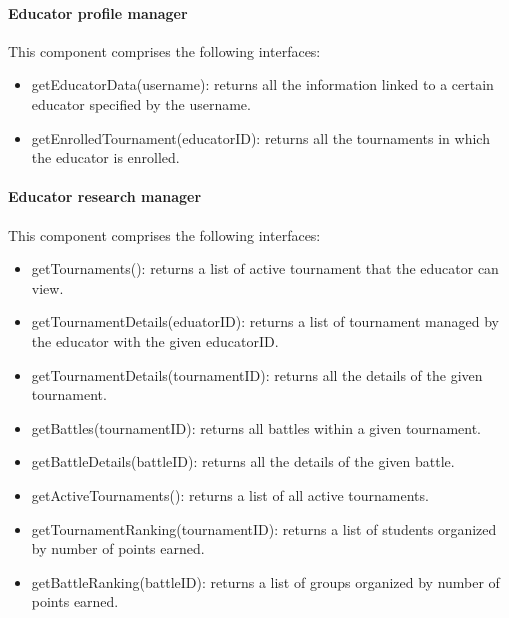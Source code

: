 \documentclass[12pt, a4paper]{report}
\begin{document}
    \paragraph*{Educator profile manager}
    This component comprises the following interfaces: 
    \begin{itemize}
        \item getEducatorData(username): returns all the information linked to a certain educator specified by the username. 
        \item getEnrolledTournament(educatorID): returns all the tournaments in which the educator is enrolled. 
    \end{itemize}

    \paragraph*{Educator research manager}
    This component comprises the following interfaces: 
    \begin{itemize}
        \item getTournaments(): returns a list of active tournament that the educator can view. 
        \item getTournamentDetails(eduatorID): returns a list of tournament managed by the educator with the given educatorID. 
        \item getTournamentDetails(tournamentID): returns all the details of the given tournament. 
        \item getBattles(tournamentID): returns all battles within a given tournament. 
        \item getBattleDetails(battleID): returns all the details of the given battle. 
        \item getActiveTournaments(): returns a list of all active tournaments.
        \item getTournamentRanking(tournamentID): returns a list of students organized by number of points earned. 
        \item getBattleRanking(battleID): returns a list of groups organized by number of points earned. 
    \end{itemize}
\end{document}
